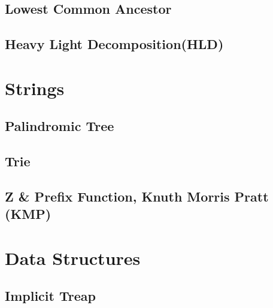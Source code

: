 \documentclass[12pt]{extarticle}
\begin{document}
\begin{multicols*}{2}
\subsection{Lowest Common Ancestor} 


\subsection{Heavy Light Decomposition(HLD)} 


\section{Strings}

% 

\subsection{Palindromic Tree} %


\subsection{Trie} %


% 

\subsection{Z \& Prefix Function, Knuth Morris Pratt (KMP)} %


\section{Data Structures}

\subsection{Implicit Treap} %



\end{multicols*}
\end{document}
